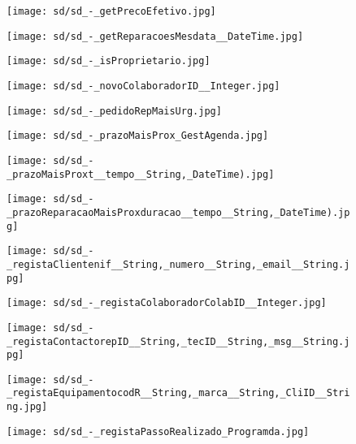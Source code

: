 \documentclass[relatorio.tex]{subfiles}
\begin{document}
\begin{landscape}
\begin{figure} \centering \texttt{[image: sd/sd\_-\_getPrecoEfetivo.jpg]} \end{figure}
\begin{figure} \centering \texttt{[image: sd/sd\_-\_getReparacoesMesdata\_\_DateTime.jpg]} \end{figure}
\begin{figure} \centering \texttt{[image: sd/sd\_-\_isProprietario.jpg]} \end{figure}
\begin{figure} \centering \texttt{[image: sd/sd\_-\_novoColaboradorID\_\_Integer.jpg]} \end{figure}
\begin{figure} \centering \texttt{[image: sd/sd\_-\_pedidoRepMaisUrg.jpg]} \end{figure}
\begin{figure} \centering \texttt{[image: sd/sd\_-\_prazoMaisProx\_GestAgenda.jpg]} \end{figure}
\begin{figure} \centering \texttt{[image: sd/sd\_-\_prazoMaisProxt\_\_tempo\_\_String,\_DateTime).jpg]} \end{figure}
\begin{figure} \centering \texttt{[image: sd/sd\_-\_prazoReparacaoMaisProxduracao\_\_tempo\_\_String,\_DateTime).jpg]} \end{figure}
\begin{figure} \centering \texttt{[image: sd/sd\_-\_registaClientenif\_\_String,\_numero\_\_String,\_email\_\_String.jpg]} \end{figure}
\begin{figure} \centering \texttt{[image: sd/sd\_-\_registaColaboradorColabID\_\_Integer.jpg]} \end{figure}
\begin{figure} \centering \texttt{[image: sd/sd\_-\_registaContactorepID\_\_String,\_tecID\_\_String,\_msg\_\_String.jpg]} \end{figure}
\begin{figure} \centering \texttt{[image: sd/sd\_-\_registaEquipamentocodR\_\_String,\_marca\_\_String,\_CliID\_\_String.jpg]} \end{figure}
\begin{figure} \centering \texttt{[image: sd/sd\_-\_registaPassoRealizado\_Programda.jpg]} \end{figure}

\end{landscape}
\end{document}
